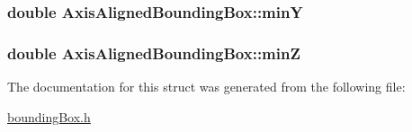 \hypertarget{structAxisAlignedBoundingBox_a518f2450583f7704cd1810f834e1bcf1}{
\subsubsection[{min\-Y}]{\setlength{\rightskip}{0pt plus 5cm}double Axis\-Aligned\-Bounding\-Box\-::min\-Y}}\label{structAxisAlignedBoundingBox_a518f2450583f7704cd1810f834e1bcf1}
\hypertarget{structAxisAlignedBoundingBox_a30f19d9aa28abba5ae6025a649c0c7b2}{
\subsubsection[{min\-Z}]{\setlength{\rightskip}{0pt plus 5cm}double Axis\-Aligned\-Bounding\-Box\-::min\-Z}}\label{structAxisAlignedBoundingBox_a30f19d9aa28abba5ae6025a649c0c7b2}


The documentation for this struct was generated from the following file\-:\begin{DoxyCompactItemize}
\item 
\hyperlink{boundingBox_8h}{bounding\-Box.\-h}\end{DoxyCompactItemize}
